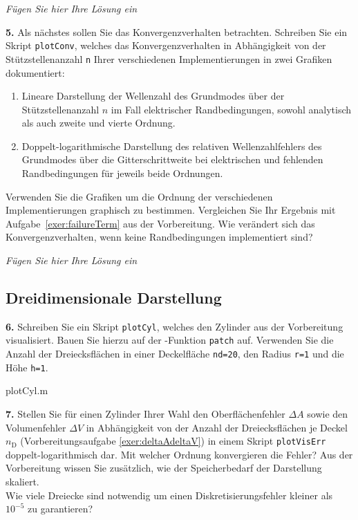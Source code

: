 \documentclass[Protokollheft.tex]{subfiles}
\begin{document}
\emph{Fügen Sie hier Ihre Lösung ein}

        \begin{framed}
	\noindent \textbf{5.} Als nächstes sollen Sie das Konvergenzverhalten betrachten. Schreiben Sie ein Skript \lstinline{plotConv}, welches das Konvergenzverhalten in Abhängigkeit von der Stützstellenanzahl \lstinline{n}
                    Ihrer verschiedenen Implementierungen in zwei Grafiken dokumentiert:
                    \begin{enumerate}
                    \item Lineare Darstellung der Wellenzahl des Grundmodes über der Stützstellenanzahl $n$ im Fall elektrischer Randbedingungen, sowohl analytisch als auch zweite und vierte Ordnung.
                    \item Doppelt-logarithmische Darstellung des relativen Wellenzahlfehlers des Grundmodes  über die Gitterschrittweite bei elektrischen und fehlenden Randbedingungen für jeweils beide Ordnungen.
                    \end{enumerate}
                    Verwenden Sie die Grafiken um die Ordnung der verschiedenen Implementierungen graphisch zu bestimmen. Vergleichen Sie Ihr Ergebnis
mit Aufgabe~\ref{exer:failureTerm} aus der Vorbereitung.  Wie verändert sich das Konvergenzverhalten, wenn keine Randbedingungen implementiert sind?\label{exer:plotConv}
\end{framed}

\emph{Fügen Sie hier Ihre Lösung ein}



{\subsection{Dreidimensionale Darstellung}}

        \begin{framed}
	\noindent \textbf{6.} Schreiben Sie ein Skript \lstinline{plotCyl}, welches den Zylinder aus der Vorbereitung visualisiert.
Bauen Sie hierzu auf der \matlab-Funktion \lstinline{patch} auf. Verwenden Sie die Anzahl der Dreiecksflächen
                    in einer Deckelfläche \lstinline{nd=20}, den Radius \lstinline{r=1} und die Höhe \lstinline {h=1}.\label{exer:plotCyl}
\end{framed}

 {plotCyl.m}

        \begin{framed}
	\noindent \textbf{7.} Stellen Sie für einen Zylinder Ihrer Wahl den Oberflächenfehler $\Delta A$ sowie den Volumenfehler $\Delta V$ in Abhängigkeit von der Anzahl der Dreiecksflächen je Deckel $n_\text{D}$ (Vorbereitungsaufgabe \ref{exer:deltaAdeltaV}) in einem Skript
                    \lstinline{plotVisErr} doppelt-logarithmisch dar.   Mit welcher Ordnung konvergieren die Fehler?
                    Aus der Vorbereitung wissen Sie zusätzlich, wie der Speicherbedarf der
                    Darstellung skaliert.\\
                    Wie viele Dreiecke sind notwendig um einen Diskretisierungsfehler kleiner als $10^{-5}$ zu garantieren?\label{exer:plotVisErr}
\end{framed}
\end{document}
